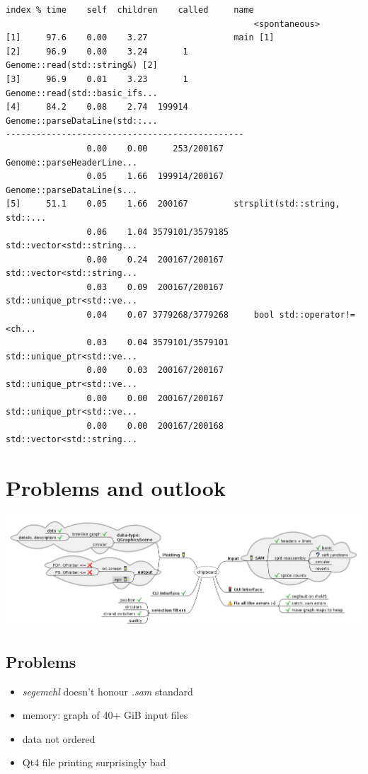 \documentclass[presentation]{beamer}
\begin{document}
\begin{verbatim}
index % time    self  children    called     name
                                                 <spontaneous>
[1]     97.6    0.00    3.27                 main [1]
[2]     96.9    0.00    3.24       1         Genome::read(std::string&) [2]
[3]     96.9    0.01    3.23       1         Genome::read(std::basic_ifs...
[4]     84.2    0.08    2.74  199914         Genome::parseDataLine(std::...
-----------------------------------------------
                0.00    0.00     253/200167      Genome::parseHeaderLine...
                0.05    1.66  199914/200167      Genome::parseDataLine(s...
[5]     51.1    0.05    1.66  200167         strsplit(std::string, std::...
                0.06    1.04 3579101/3579185     std::vector<std::string...
                0.00    0.24  200167/200167      std::vector<std::string...
                0.03    0.09  200167/200167      std::unique_ptr<std::ve...
                0.04    0.07 3779268/3779268     bool std::operator!=<ch...
                0.03    0.04 3579101/3579101     std::unique_ptr<std::ve...
                0.00    0.03  200167/200167      std::unique_ptr<std::ve...
                0.00    0.00  200167/200167      std::unique_ptr<std::ve...
                0.00    0.00  200167/200168      std::vector<std::string...
\end{verbatim}

\section*{Problems and outlook}
\label{sec-4}

\includegraphics[width=.9\linewidth]{./cb2/roadmap.png}

\subsection*{Problems}
\label{sec-4-1}

\begin{itemize}
\item \emph{segemehl} doesn't honour \emph{.sam} standard
\item memory: graph of 40+ GiB input files
\item data not ordered
\item Qt4 file printing surprisingly bad
\end{itemize}
\end{document}
